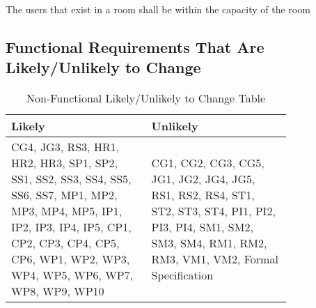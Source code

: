 \documentclass[12pt]{article}
\begin{document}
The users that exist in a room shall be within the capacity of the room

\subsection{Functional Requirements That Are Likely/Unlikely to Change}
\begin{table}[h]
    \centering
    \begin{tabular}{|p{0.40\linewidth} | p{0.40\linewidth}|}
    \hline
         Likely & Unlikely \\
         \hline
         CG4, JG3, RS3, HR1, HR2, HR3, SP1, SP2, SS1, SS2, SS3, SS4, SS5, SS6, SS7, MP1, MP2, MP3, MP4, MP5, IP1, IP2, IP3, IP4, IP5, CP1, CP2, CP3, CP4, CP5, CP6, WP1, WP2, WP3, WP4, WP5, WP6, WP7, WP8, WP9, WP10 & CG1, CG2, CG3, CG5, JG1, JG2, JG4, JG5, RS1, RS2, RS4, ST1, ST2, ST3, ST4, PI1, PI2, PI3, PI4, SM1, SM2, SM3, SM4, RM1, RM2, RM3, VM1, VM2, Formal Specification   \\
         \hline
    \end{tabular}
    \caption{Non-Functional Likely/Unlikely to Change Table}
    \label{tab:my_label2}
\end{table}
\end{document}
